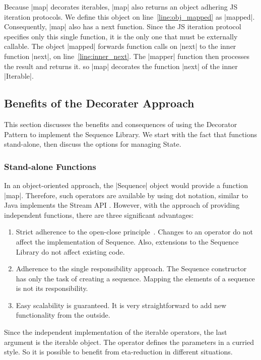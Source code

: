 Because |map| decorates iterables, |map| also returns an object adhering JS
iteration protocols. 
We define this object on line~\ref{line:obj_mapped} as |mapped|. 
Consequently, |map| also has a next function. Since the JS iteration protocol 
specifies only this single function, it is the only one that must be externally 
callable. The object |mapped| forwards function calls on |next| to the
inner function |next|, on line~\ref{line:inner_next}. The |mapper| function then 
processes the result and returns it. so |map| decorates the function |next| of
the inner |Iterable|.

\subsection{Benefits of the Decorater Approach}
\label{sub:Benefits of the Decorater Approach}
This section discusses the benefits and consequences of using the Decorator 
Pattern to implement the Sequence Library. We start with the fact that functions 
stand-alone, then discuss the options for managing State.

\subsubsection{Stand-alone Functions}
\label{subsub:Standalone Functions}
In an object-oriented approach, the |Sequence| object would provide a function
|map|. Therefore, such operators are available by using dot notation,
similar to Java implements the Stream API \cite{java_stream}. 
However, with the approach of providing independent functions, there 
are three significant advantages:

\begin{enumerate}
  \item {Strict adherence to the open-close principle~\cite[p.~3]{eilebrecht_patterns_2019}. Changes to an operator do
      not affect the implementation of Sequence. Also, extensions to the 
      Sequence Library do not affect existing code.
    }
  \item{Adherence to the single responsibility approach. The Sequence 
      constructor has only the task of creating a sequence. Mapping the
    elements of a sequence is not its responsibility.
  }
  \item{Easy scalability is guaranteed. It is very straightforward to add new 
    functionality from the outside.
  }
\end{enumerate}

Since the independent implementation of the iterable operators, the last
argument is the iterable object. The operator defines the 
parameters in a curried style. So it is possible to benefit from eta-reduction 
in different situations.

